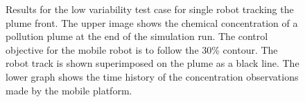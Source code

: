\documentclass[ letterpaper, 10 pt, conference]{ieeeconf}  %
\begin{document}
\begin{figure}[thpb]
      \centering
          \caption{Results for the low variability test case for single robot tracking the plume front.  The upper image shows the chemical concentration of a pollution plume at the end of the simulation run.  The control objective for the mobile robot is to follow the 30\% contour.  The robot track is shown superimposed on the plume as a black line.  The lower graph shows the time history of the concentration observations made by the mobile platform.}
   \label{f:case1}
 \end{figure}
\end{document}
